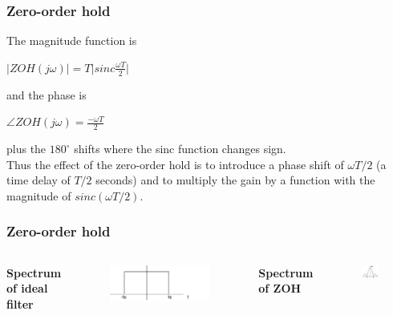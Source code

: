 \begin{frame}
	\frametitle{Zero-order hold}
	The magnitude function is\\
	\vspace{-1ex}
	\begin{center}
		$|ZOH(j\omega)| = T\Big|sinc\frac{\omega T}{2} \Big|$
	\end{center}
	\vspace{-1ex}
	and the phase is\\
	\vspace{-1ex}
	\begin{center}
		$\angle ZOH(j\omega)=\frac{-\omega T}{2}$
	\end{center}
	\vspace{-1ex}
	plus the $180^\circ$ shifts where the sinc function changes sign.\\
	\medskip
	Thus the effect of the zero-order hold is to introduce a phase shift of $\omega T/2$ (a time delay of $T/2$ seconds) and to multiply the gain by a function with the magnitude of $sinc(\omega T/2)$.
\end{frame}

\begin{frame}
	\frametitle{Zero-order hold}
	\begin{columns}
		\textbf{Spectrum of ideal filter}
		\vspace{8ex}
		\begin{figure}
			\includegraphics[width=1\linewidth]{spectrum_ideal}
		\end{figure}
		\textbf{Spectrum of ZOH}
		\begin{figure}
			\includegraphics[width=0.8\linewidth]{spectrum_zoh}
		\end{figure}
	\end{columns}
\end{frame}

